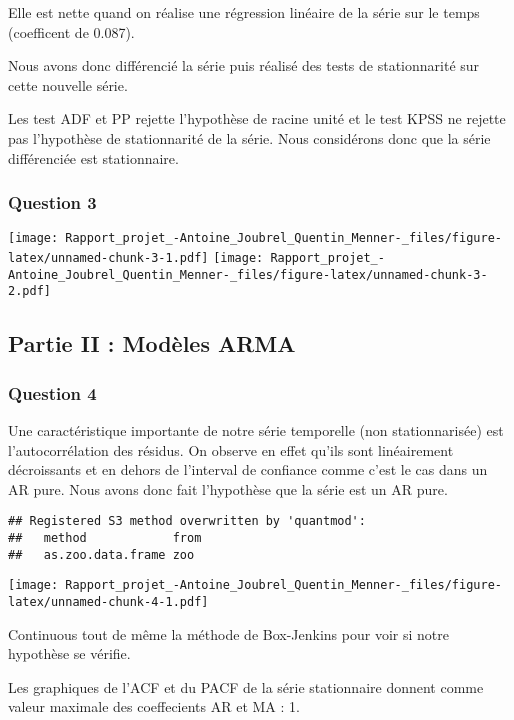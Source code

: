 \documentclass[
  landscape]{article}
\begin{document}
Elle est nette quand on réalise une régression linéaire de la série sur
le temps (coefficent de 0.087).

Nous avons donc différencié la série puis réalisé des tests de
stationnarité sur cette nouvelle série.

Les test ADF et PP rejette l'hypothèse de racine unité et le test KPSS
ne rejette pas l'hypothèse de stationnarité de la série. Nous
considérons donc que la série différenciée est stationnaire.

\hypertarget{question-3}{%
\subsubsection{Question 3}\label{question-3}}

\texttt{[image: Rapport\_projet\_-Antoine\_Joubrel\_Quentin\_Menner-\_files/figure-latex/unnamed-chunk-3-1.pdf]}
\texttt{[image: Rapport\_projet\_-Antoine\_Joubrel\_Quentin\_Menner-\_files/figure-latex/unnamed-chunk-3-2.pdf]}

\hypertarget{partie-ii-moduxe8les-arma}{%
\subsection{Partie II : Modèles ARMA}\label{partie-ii-moduxe8les-arma}}

\hypertarget{question-4}{%
\subsubsection{Question 4}\label{question-4}}

Une caractéristique importante de notre série temporelle (non
stationnarisée) est l'autocorrélation des résidus. On observe en effet
qu'ils sont linéairement décroissants et en dehors de l'interval de
confiance comme c'est le cas dans un AR pure. Nous avons donc fait
l'hypothèse que la série est un AR pure.

\begin{verbatim}
## Registered S3 method overwritten by 'quantmod':
##   method            from
##   as.zoo.data.frame zoo
\end{verbatim}

\texttt{[image: Rapport\_projet\_-Antoine\_Joubrel\_Quentin\_Menner-\_files/figure-latex/unnamed-chunk-4-1.pdf]}

Continuous tout de même la méthode de Box-Jenkins pour voir si notre
hypothèse se vérifie.

Les graphiques de l'ACF et du PACF de la série stationnaire donnent
comme valeur maximale des coeffecients AR et MA : 1.
\end{document}
